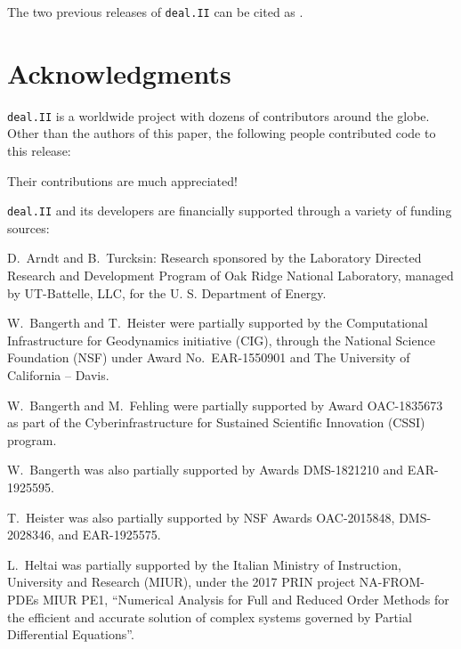 \documentclass{ansarticle-preprint}
\newcommand{\specialword}[1]{\texttt{#1}}
\newcommand{\dealii}{{\specialword{deal.II}}\xspace}
\begin{document}
The two previous releases of \dealii can be cited as
\cite{dealII92,dealII93}.


\section{Acknowledgments}

\dealii is a worldwide project with dozens of contributors around the
globe. Other than the authors of this paper, the following people
contributed code to this release:\\
%
%




Their contributions are much appreciated!


\bigskip

\dealii and its developers are financially supported through a
variety of funding sources:


D.~Arndt and B.~Turcksin: Research sponsored by the Laboratory Directed Research and
Development Program of Oak Ridge National Laboratory, managed by UT-Battelle,
LLC, for the U. S. Department of Energy.

W.~Bangerth and T.~Heister were partially
supported by the Computational Infrastructure for Geodynamics initiative
(CIG), through the National Science Foundation (NSF) under Award
No.~EAR-1550901 and The University of California -- Davis.

W.~Bangerth and M.~Fehling were partially supported by Award OAC-1835673
as part of the Cyberinfrastructure for Sustained Scientific Innovation (CSSI)
program.

W.~Bangerth was also partially supported by Awards DMS-1821210 and EAR-1925595.

T.~Heister was also partially supported by NSF
Awards OAC-2015848, DMS-2028346, and
EAR-1925575.

L.~Heltai was partially supported by the Italian Ministry of Instruction,
University and Research (MIUR), under the 2017 PRIN project NA-FROM-PDEs MIUR
PE1, ``Numerical Analysis for Full and Reduced Order Methods for the efficient
and accurate solution of complex systems governed by Partial Differential
Equations''.
\end{document}
